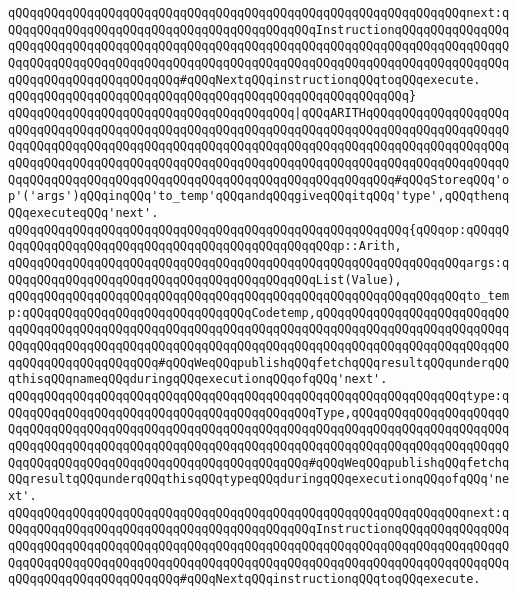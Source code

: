 \verb|qQQqqQQqqQQqqQQqqQQqqQQqqQQqqQQqqQQqqQQqqQQqqQQqqQQqqQQqqQQqqQQqnext:qQQqqQQqqQQqqQQqqQQqqQQqqQQqqQQqqQQqqQQqqQQqInstructionqQQqqQQqqQQqqQQqqQQqqQQqqQQqqQQqqQQqqQQqqQQqqQQqqQQqqQQqqQQqqQQqqQQqqQQqqQQqqQQqqQQqqQQqqQQqqQQqqQQqqQQqqQQqqQQqqQQqqQQqqQQqqQQqqQQqqQQqqQQqqQQqqQQqqQQqqQQqqQQqqQQqqQQqqQQqqQQqqQQq#qQQqNextqQQqinstructionqQQqtoqQQqexecute.|\newline
\verb|qQQqqQQqqQQqqQQqqQQqqQQqqQQqqQQqqQQqqQQqqQQqqQQqqQQqqQQq}|\newline
\newline
\verb|qQQqqQQqqQQqqQQqqQQqqQQqqQQqqQQqqQQqqQQq|\verb#|qQQqARITHqQQqqQQqqQQqqQQqqQQqqQQqqQQqqQQqqQQqqQQqqQQqqQQqqQQqqQQqqQQqqQQqqQQqqQQqqQQqqQQqqQQqqQQqqQQqqQQqqQQqqQQqqQQqqQQqqQQqqQQqqQQqqQQqqQQqqQQqqQQqqQQqqQQqqQQqqQQqqQQqqQQqqQQqqQQqqQQqqQQqqQQqqQQqqQQqqQQqqQQqqQQqqQQqqQQqqQQqqQQqqQQqqQQqqQQqqQQqqQQqqQQqqQQqqQQqqQQqqQQqqQQqqQQqqQQqqQQqqQQqqQQq#\verb|#qQQqStoreqQQq'op'('args')qQQqinqQQq'to_temp'qQQqandqQQqgiveqQQqitqQQq'type',qQQqthenqQQqexecuteqQQq'next'.|\newline
\verb|qQQqqQQqqQQqqQQqqQQqqQQqqQQqqQQqqQQqqQQqqQQqqQQqqQQqqQQq{qQQqop:qQQqqQQqqQQqqQQqqQQqqQQqqQQqqQQqqQQqqQQqqQQqqQQqqQQqp::Arith,|\newline
\verb|qQQqqQQqqQQqqQQqqQQqqQQqqQQqqQQqqQQqqQQqqQQqqQQqqQQqqQQqqQQqqQQqargs:qQQqqQQqqQQqqQQqqQQqqQQqqQQqqQQqqQQqqQQqqQQqList(Value),|\newline
\verb|qQQqqQQqqQQqqQQqqQQqqQQqqQQqqQQqqQQqqQQqqQQqqQQqqQQqqQQqqQQqqQQqto_temp:qQQqqQQqqQQqqQQqqQQqqQQqqQQqqQQqCodetemp,qQQqqQQqqQQqqQQqqQQqqQQqqQQqqQQqqQQqqQQqqQQqqQQqqQQqqQQqqQQqqQQqqQQqqQQqqQQqqQQqqQQqqQQqqQQqqQQqqQQqqQQqqQQqqQQqqQQqqQQqqQQqqQQqqQQqqQQqqQQqqQQqqQQqqQQqqQQqqQQqqQQqqQQqqQQqqQQqqQQqqQQqqQQq#qQQqWeqQQqpublishqQQqfetchqQQqresultqQQqunderqQQqthisqQQqnameqQQqduringqQQqexecutionqQQqofqQQq'next'.|\newline
\verb|qQQqqQQqqQQqqQQqqQQqqQQqqQQqqQQqqQQqqQQqqQQqqQQqqQQqqQQqqQQqqQQqtype:qQQqqQQqqQQqqQQqqQQqqQQqqQQqqQQqqQQqqQQqqQQqType,qQQqqQQqqQQqqQQqqQQqqQQqqQQqqQQqqQQqqQQqqQQqqQQqqQQqqQQqqQQqqQQqqQQqqQQqqQQqqQQqqQQqqQQqqQQqqQQqqQQqqQQqqQQqqQQqqQQqqQQqqQQqqQQqqQQqqQQqqQQqqQQqqQQqqQQqqQQqqQQqqQQqqQQqqQQqqQQqqQQqqQQqqQQqqQQqqQQqqQQqqQQq#qQQqWeqQQqpublishqQQqfetchqQQqresultqQQqunderqQQqthisqQQqtypeqQQqduringqQQqexecutionqQQqofqQQq'next'.|\newline
\verb|qQQqqQQqqQQqqQQqqQQqqQQqqQQqqQQqqQQqqQQqqQQqqQQqqQQqqQQqqQQqqQQqnext:qQQqqQQqqQQqqQQqqQQqqQQqqQQqqQQqqQQqqQQqqQQqInstructionqQQqqQQqqQQqqQQqqQQqqQQqqQQqqQQqqQQqqQQqqQQqqQQqqQQqqQQqqQQqqQQqqQQqqQQqqQQqqQQqqQQqqQQqqQQqqQQqqQQqqQQqqQQqqQQqqQQqqQQqqQQqqQQqqQQqqQQqqQQqqQQqqQQqqQQqqQQqqQQqqQQqqQQqqQQqqQQqqQQq#qQQqNextqQQqinstructionqQQqtoqQQqexecute.|\newline
